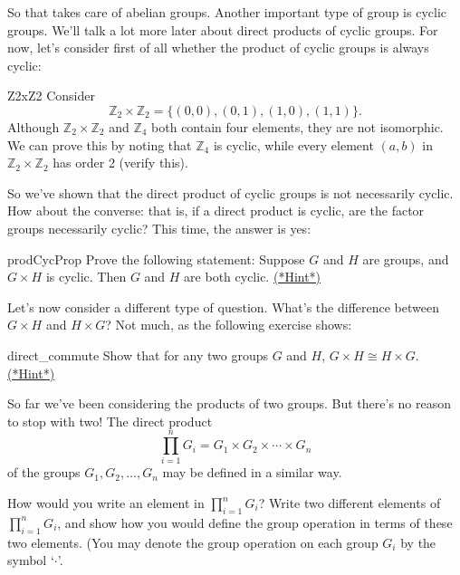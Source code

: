 So that takes care of abelian groups. Another important type of group is cyclic groups. We'll talk a lot more later about direct products of cyclic groups. For now, let's consider first of all whether the product of cyclic groups is always cyclic: 

\begin{example}{Z2xZ2}
Consider
\[
{\mathbb Z}_2 \times {\mathbb Z}_2 = \{ (0, 0), (0, 1), (1, 0),(1, 1) \}.
\]
Although ${\mathbb Z}_2 \times {\mathbb Z}_2$ and ${\mathbb Z}_4$ both contain four elements,  they are not isomorphic. We can prove this by noting that ${\mathbb Z}_4$ is cyclic, while  every element $(a,b)$ in ${\mathbb Z}_2 \times {\mathbb Z}_2$ has order 2 (verify this).	
\end{example}

So we've shown that the direct product of cyclic groups is not necessarily cyclic. How about the converse:  that is, if a direct product is cyclic, are the factor groups necessarily cyclic?  This time, the answer is yes:

\begin{exercise}{prodCycProp}
Prove  the following statement: Suppose $G$ and $H$ are groups, and $G \times H$ is cyclic. Then $G$ and $H$ are both cyclic. 
\hyperref[sec:Isomorphism:hints]{(*Hint*)}
\end{exercise}	

Let's now consider a different type of question. What's the difference between $G \times H$ and $H \times G$?  Not much, as the following exercise shows:
 
\begin{exercise}{direct_commute}
Show that for any two groups $G$ and $H$,  $G \times H \cong H \times G$.
\hyperref[sec:Isomorphism:hints]{(*Hint*)}
\end{exercise}


So far we've been considering the products of two groups. But there's no reason to stop with two! The direct product
\[
\prod_{i = 1}^n G_i = G_1 \times G_2 \times \cdots \times G_n
\]
of the groups $G_1, G_2, \ldots, G_n$ may be defined in a similar way. 

\begin{exercise}{}
How would you write an element in $\prod_{i = 1}^n G_i$? Write two different elements of $\prod_{i = 1}^n G_i$, and show how you would define the group operation in terms of these two elements. (You may denote the group operation on each group $G_i$ by the symbol `$\cdot$'.
\end{exercise}	

